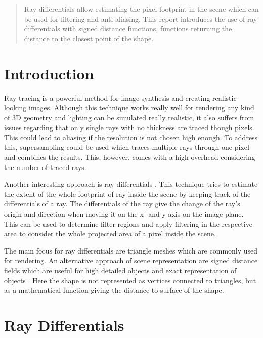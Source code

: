 \documentclass[12pt]{article}
\begin{document}
	
\maketitle

\begin{abstract}
Ray differentials allow estimating the pixel footprint in the scene which can be used for filtering and anti-aliasing. This report introduces the use of ray differentials with signed distance functions, functions returning the distance to the closest point of the shape.  
\end{abstract}

\section{Introduction}
Ray tracing is a powerful method for image synthesis and creating realistic looking images. Although this technique works really well for rendering any kind of 3D geometry and lighting can be simulated really realistic, it also suffers from issues regarding that only single rays with no thickness are traced though pixels. This could lead to aliasing if the resolution is not chosen high enough. To address this, supersampling could be used which traces multiple rays through one pixel and combines the results. This, however, comes with a high overhead considering the number of traced rays.

Another interesting approach is ray differentials \cite{Igehy:1999}. This technique tries to estimate the extent of the whole footprint of ray inside the scene by keeping track of the differentials of a ray. The differentials of the ray give the change of the ray's origin and direction when moving it on the x- and y-axis on the image plane. This can be used to determine filter regions and apply filtering in the respective area to consider the whole projected area of a pixel inside the scene.

The main focus for ray differentials are triangle meshes which are commonly used for rendering. An alternative approach of scene representation are signed distance fields which are useful for high detailed objects and exact representation of objects \cite{jones:2006}. Here the shape is not represented as vertices connected to triangles, but as a mathematical function giving the distance to surface of the shape.

\section{Ray Differentials}
\end{document}
